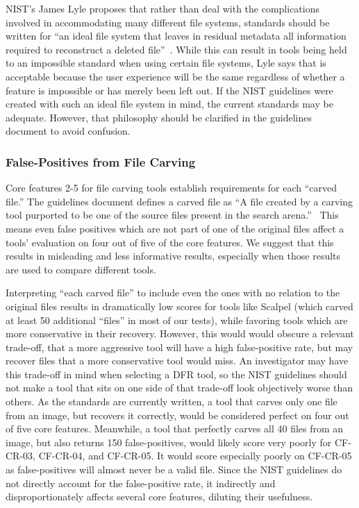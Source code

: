 \begin{paraphrase}
NIST's James Lyle proposes that rather than deal with the complications involved in accommodating 
many different file systems, standards should be written for ``an ideal file system that leaves in 
residual metadata  all  information  required  to  reconstruct  a  deleted  file''~\cite{lyle2011-ICDF2C}. 
While this can result in tools being held to an impossible standard when using certain file systems, 
Lyle says that is acceptable because the user experience will be the same regardless of whether a feature is impossible or has merely been left out.
If the NIST guidelines were created with such an ideal file system in mind, the current standards may be adequate.
However, that philosophy should be clarified in the guidelines document to avoid confusion.
\end{paraphrase}



\subsubsection{False-Positives from File Carving}

Core features 2-5 for file carving tools establish requirements for each ``carved file.''
The guidelines document defines a carved file as ``A file created by a carving tool purported to be one of the source files present in the search arena.''~\cite{carving_standards}
This means even false positives which are not part of one of the original files affect a tools' evaluation on four out of five of the core features.
We suggest that this results in misleading and less informative results, especially when those results are used to compare different tools.
 
Interpreting ``each carved file'' to include even the ones with no relation to the original files results in dramatically low scores for tools like Scalpel (which carved at least 50 additional ``files'' in most of our tests), while favoring tools which are more conservative in their recovery.
However, this would would obscure a relevant trade-off, that a more aggressive tool will have a high false-positive rate, but may recover files that a more conservative tool would miss.
An investigator may have this trade-off in mind when selecting a DFR tool, so the NIST guidelines should not make a tool that sits on one side of that trade-off look objectively worse than others.
As the standards are currently written, a tool that carves only one file from an image, but recovers it correctly, would be considered perfect on four out of five core features.
Meanwhile, a tool that perfectly carves all 40 files from an image, but also returns 150 false-positives, would likely score very poorly for CF-CR-03, CF-CR-04, and CF-CR-05.
It would score especially poorly on CF-CR-05 as false-positives will almost never be a valid file.
Since the NIST guidelines do not directly account for the false-positive rate, it indirectly and disproportionately affects several core features, diluting their usefulness.


